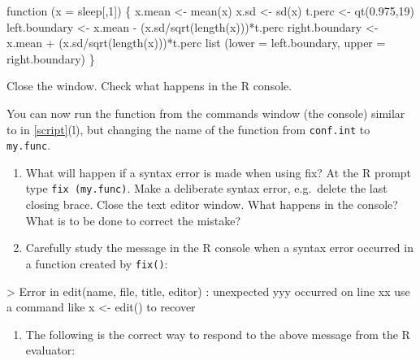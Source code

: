 \documentclass[
]{book}
\newenvironment{Shaded}{\begin{snugshade}}{\end{snugshade}}
\newcommand{\NormalTok}[1]{#1}
\providecommand{\tightlist}{%
  \setlength{\itemsep}{0pt}\setlength{\parskip}{0pt}}
\begin{document}
\begin{Shaded}
\begin{Highlighting}[]
\NormalTok{function (x = sleep[,1])}
\NormalTok{\{}
\NormalTok{  x.mean \textless{}{-} mean(x)\textasciigrave{}}
\NormalTok{  x.sd \textless{}{-} sd(x)}
\NormalTok{  t.perc \textless{}{-} qt(0.975,19)}
\NormalTok{  left.boundary \textless{}{-} x.mean {-} (x.sd/sqrt(length(x)))*t.perc}
\NormalTok{  right.boundary \textless{}{-} x.mean + (x.sd/sqrt(length(x)))*t.perc}
\NormalTok{  list (lower = left.boundary, upper = right.boundary)}
\NormalTok{\}}
\end{Highlighting}
\end{Shaded}

Close the window. Check what happens in the R console.

You can now run the function from the commands window (the console) similar to in \ref{script}(l), but changing the name of the function from \texttt{conf.int} to \texttt{my.func}.

\begin{enumerate}
\def\labelenumi{(\alph{enumi})}
\setcounter{enumi}{1}
\item
  What will happen if a syntax error is made when using fix? At the R prompt type \texttt{fix\ (my.func)}. Make a deliberate syntax error, e.g.~delete the last closing brace. Close the text editor window. What happens in the console? What is to be done to correct the mistake?
\item
  Carefully study the message in the R console when a syntax error occurred in a function created by \texttt{fix()}:
\end{enumerate}

\begin{Shaded}
\begin{Highlighting}[]
\NormalTok{\textgreater{} Error in edit(name, file, title, editor) :}
\NormalTok{    unexpected \textquotesingle{}yyy\textquotesingle{} occurred on line xx}
\NormalTok{    use a command like}
\NormalTok{    x \textless{}{-} edit()}
\NormalTok{    to recover}
\end{Highlighting}
\end{Shaded}

\begin{enumerate}
\def\labelenumi{(\alph{enumi})}
\setcounter{enumi}{3}
\tightlist
\item
  The following is the correct way to respond to the above message from the R evaluator:
\end{enumerate}
\end{document}
